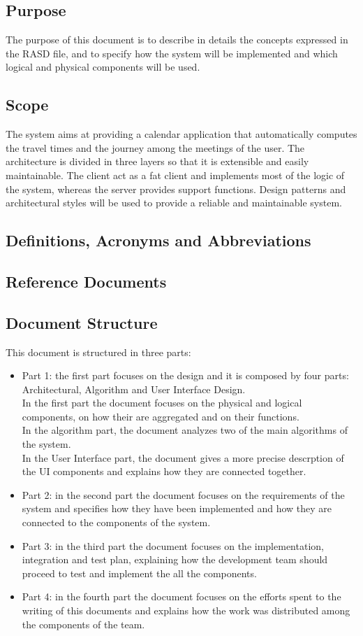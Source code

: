 \subsection{Purpose}
The purpose of this document is to describe in details the concepts expressed in the RASD file, and to specify how the system will be implemented and which logical and physical components will be used.

\subsection{Scope}
The system aims at providing a calendar application that automatically computes the travel times and the journey among the meetings of the user.
The architecture is divided in three layers so that it is extensible and easily maintainable.
The client act as a fat client and implements most of the logic of the system, whereas the server provides support functions.
Design patterns and architectural styles will be used to provide a reliable and maintainable system.

\subsection{Definitions, Acronyms and Abbreviations}


\subsection{Reference Documents}



\subsection{Document Structure}
This document is structured in three parts:
\begin{itemize}
\item
Part 1: the first part focuses on the design and it is composed by four parts: Architectural, Algorithm and User Interface Design.\\
In the first part the document focuses on the physical and logical components, on how their are aggregated and on their functions.\\
In the algorithm part, the document analyzes two of the main algorithms of the system.\\
In the User Interface part, the document gives a more precise descrption of the UI components and explains how they are connected together.
\item
Part 2: in the second part the document focuses on the requirements of the system and specifies how they have been implemented and how they are connected to the components of the system.
\item
Part 3: in the third part the document focuses on the implementation, integration and test plan, explaining how the development team should proceed to test and implement the all the components.
\item
Part 4: in the fourth part the document focuses on the efforts spent to the writing of this documents and explains how the work was distributed among the components of the team.
\end{itemize}